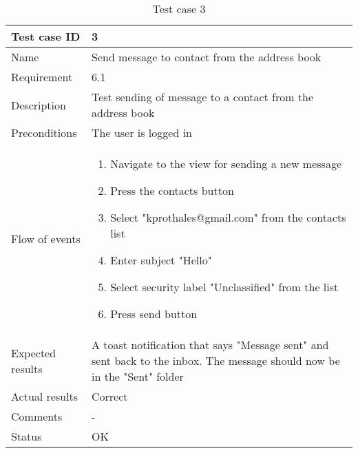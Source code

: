 		\begin{table}[htb]
			\begin{tabular}{l|p{10cm}}
				Test case ID & 3 \\ \hline
				Name & Send message to contact from the address book\\ \hline
				Requirement & 6.1\\ \hline
				Description & Test sending of message to a contact from the address book\\ \hline
				Preconditions & The user is logged in\\ \hline
				Flow of events & 
					\begin{enumerate}
						\item{}Navigate to the view for sending a new message
						\item{}Press the contacts button
						\item{}Select "kprothales@gmail.com" from the contacts list
						\item{}Enter subject "Hello"
						\item{}Select security label "Unclassified" from the list
						\item{}Press send button
					\end{enumerate} \\ \hline
				Expected results & A toast notification that says "Message sent" and sent back to the inbox. The message 					should now be in the "Sent" folder\\ \hline
				Actual results & Correct\\ \hline
				Comments & -\\ \hline
				Status & OK\\ \hline
			\end{tabular}
			\caption{Test case 3} \label{tab:case3}
		\end{table}

